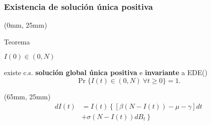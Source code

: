\begin{frame}
    \frametitle{Existencia de solución única positiva}
    \begin{textblock*}{60mm}(0mm, 25mm)
        \begin{yellowbox}{Teorema}
            \begin{list}{\bullet}{}
                \item
                    $I(0) \in (0, N)$
            \end{list}
            \tcblower
             existe c.s.
            \textbf{solución 
            global única positiva} 
            e 
            \textbf{invariante}
            a EDE(\star)
            $$
                \Pr
                \{
                    I(t) \in (0, N)
                    \ \forall t \geq 0
                \} = 1.
            $$
        \end{yellowbox}
    \end{textblock*}
    \begin{textblock*}{60mm}(65mm, 25mm)
        \begin{align*}
            dI(t) &= 
                I(t)
                \left\{
                    [
                        \beta (N - I(t))
                        -\mu - \gamma
                    ]
                    dt
                \right.
                \\
                 &+
                \left.
                    \sigma (N-I(t))
                    dB_t
                \right\}
                \tag{\star}
        \end{align*}
    \end{textblock*}
\end{frame}
